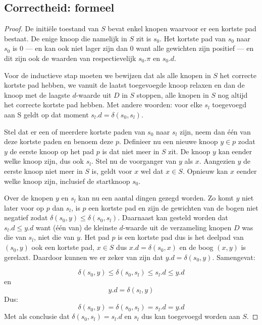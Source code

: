 \documentclass[conference]{IEEEtran}
\theoremstyle{definition}
\begin{document}
\subsection{Correctheid: formeel}
\begin{proof}
De initiële toestand van $S$ bevat enkel knopen waarvoor er een kortste pad bestaat. De enige knoop die namelijk in $S$ zit is $s_0$. Het kortste pad van $s_0$ naar $s_0$ is $0$ --- en kan ook niet lager zijn dan $0$ want alle gewichten zijn positief --- en dit zijn ook de waarden van respectievelijk $s_0.\pi$ en $s_0.d$.

Voor de inductieve stap moeten we bewijzen dat als alle knopen in $S$ het correcte kortste pad hebben, we vanuit de laatst toegevoegde knoop relaxen en dan de knoop met de laagste $d$-waarde uit $D$ in $S$ stoppen, alle knopen in $S$ nog altijd het correcte kortste pad hebben. Met andere woorden: voor elke $s_l$ toegevoegd aan S geldt op dat moment $s_l.d = \delta(s_0, s_l)$.

Stel dat er een of meerdere kortste paden van $s_0$ naar $s_l$ zijn, neem dan één van deze kortste paden en benoem deze $p$. Definieer nu een nieuwe knoop $y \in p$ zodat $y$ de eerste knoop op het pad $p$ is dat niet meer in $S$ zit. De knoop $y$ kan eender welke knoop zijn, dus ook $s_l$. Stel nu de voorganger van $y$ als $x$. Aangezien $y$ de eerste knoop niet meer in $S$ is, geldt voor $x$ wel dat $x \in S$. Opnieuw kan $x$ eender welke knoop zijn, inclusief de startknoop $s_0$.

Over de knopen $y$ en $s_l$ kan nu een aantal dingen gezegd worden. Zo komt $y$ niet later voor op $p$ dan $s_l$, is $p$ een kortste pad en zijn de gewichten van de bogen niet negatief zodat $\delta(s_0, y) \leq \delta(s_0, s_l)$. Daarnaast kan gesteld worden dat $s_l.d \leq y.d$ want (één van) de kleinste $d$-waarde uit de verzameling knopen $D$ was die van $s_l$, niet die van $y$. Het pad $p$ is een kortste pad dus is het deelpad van $(s_0, y)$ ook een kortste pad, $x \in S$ dus $x.d = \delta(s_0, x)$ en de boog $(x, y)$ is gerelaxt. Daardoor kunnen we er zeker van zijn dat $y.d = \delta(s_0, y)$. Samengevat:

\[\delta(s_0, y) \leq \delta(s_0, s_l) \leq s_l.d \leq y.d\]
en
\[y.d = \delta(s_l, y)\]
Dus:
\[\delta(s_0, y) = \delta(s_0, s_l) = s_l.d = y.d\]
Met als conclusie dat $\delta(s_0, s_l) = s_l.d$ en $s_l$ dus kan toegevoegd worden aan $S$.
\end{proof}
\end{document}
